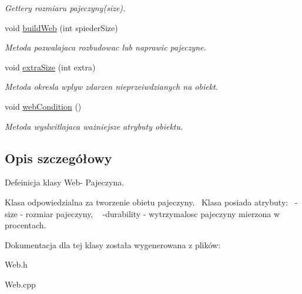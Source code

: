 \begin{DoxyCompactItemize}
\begin{DoxyCompactList}\small\item\em Gettery rozmiaru pajeczyny(size). \end{DoxyCompactList}\item 
void \hyperlink{class_web_a4d924836818708344ea77918cf638fb1}{build\+Web} (int spieder\+Size)\hypertarget{class_web_a4d924836818708344ea77918cf638fb1}{}\label{class_web_a4d924836818708344ea77918cf638fb1}

\begin{DoxyCompactList}\small\item\em Metoda pozwalajaca rozbudowac lub naprawic pajeczyne. \end{DoxyCompactList}\item 
void \hyperlink{class_web_a461e782c4d1e94b475b84f9d71e75ffb}{extra\+Size} (int extra)\hypertarget{class_web_a461e782c4d1e94b475b84f9d71e75ffb}{}\label{class_web_a461e782c4d1e94b475b84f9d71e75ffb}

\begin{DoxyCompactList}\small\item\em Metoda okresla wplyw zdarzen nieprzeiwdzianych na obiekt. \end{DoxyCompactList}\item 
void \hyperlink{class_web_a87662acf1142f9e963437f0492615997}{web\+Condition} ()\hypertarget{class_web_a87662acf1142f9e963437f0492615997}{}\label{class_web_a87662acf1142f9e963437f0492615997}

\begin{DoxyCompactList}\small\item\em Metoda wyslwitlajaca ważniejsze atrybuty obiektu. \end{DoxyCompactList}\end{DoxyCompactItemize}


\subsection{Opis szczegółowy}
Defeinicja klasy Web-\/ Pajeczyna. 

Klasa odpowiedzialna za tworzenie obietu pajeczyny.~\newline
 Klasa posiada atrybuty\+:~\newline
-\/size -\/ rozmiar pajeczyny, ~\newline
-\/durability -\/ wytrzymalosc pajeczyny mierzona w procentach. 

Dokumentacja dla tej klasy została wygenerowana z plików\+:\begin{DoxyCompactItemize}
\item 
Web.\+h\item 
Web.\+cpp\end{DoxyCompactItemize}
